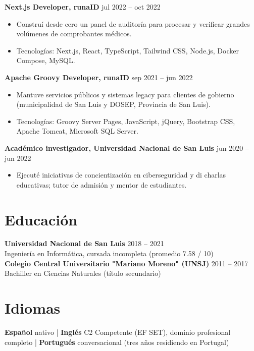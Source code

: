 \documentclass[10pt, a4paper]{article}
\begin{document}
\textbf{Next.js Developer, runaID} \hfill jul 2022 -- oct 2022
\begin{itemize}[leftmargin=10pt, noitemsep]
    \item Construí desde cero un panel de auditoría para procesar y verificar grandes volúmenes de comprobantes médicos.
    \item Tecnologías: Next.js, React, TypeScript, Tailwind CSS, Node.js, Docker Compose, MySQL.
\end{itemize}

\textbf{Apache Groovy Developer, runaID} \hfill sep 2021 -- jun 2022
\begin{itemize}[leftmargin=10pt, noitemsep]
    \item Mantuve servicios públicos y sistemas legacy para clientes de gobierno (municipalidad de San Luis y DOSEP, Provincia de San Luis).
    \item Tecnologías: Groovy Server Pages, JavaScript, jQuery, Bootstrap CSS, Apache Tomcat, Microsoft SQL Server.
\end{itemize}

\textbf{Académico investigador, Universidad Nacional de San Luis} \hfill jun 2020 -- jun 2022
\begin{itemize}[leftmargin=10pt, noitemsep]
    \item Ejecuté iniciativas de concientización en ciberseguridad y di charlas educativas; tutor de admisión y mentor de estudiantes.
\end{itemize}

\section{Educación}
\textbf{Universidad Nacional de San Luis} \hfill 2018 -- 2021 \\
Ingeniería en Informática, cursada incompleta (promedio 7.58 / 10) \\[2pt]
\textbf{Colegio Central Universitario "Mariano Moreno" (UNSJ)} \hfill 2011 -- 2017 \\
Bachiller en Ciencias Naturales (título secundario)

\section{Idiomas}
\textbf{Español} nativo | \textbf{Inglés} C2 Competente (EF SET), dominio profesional completo | \textbf{Portugués} conversacional (tres años residiendo en Portugal)
\end{document}
